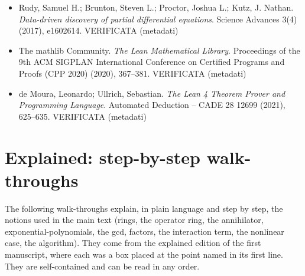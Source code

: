 \documentclass[11pt]{article}
\theoremstyle{plain}
\theoremstyle{definition}
\theoremstyle{remark}
\begin{document}
\begin{itemize}[itemsep=2pt,leftmargin=1.2em,font=\small]
\item Rudy, Samuel H.; Brunton, Steven L.; Proctor, Joshua L.; Kutz, J. Nathan. \emph{Data-driven discovery of partial differential equations}. Science Advances 3(4) (2017), e1602614. \textsf{\footnotesize VERIFICATA (metadati)}
\item {The mathlib Community}. \emph{The {L}ean Mathematical Library}. Proceedings of the 9th ACM SIGPLAN International Conference on Certified Programs and Proofs (CPP 2020) (2020), 367--381. \textsf{\footnotesize VERIFICATA (metadati)}
\item de Moura, Leonardo; Ullrich, Sebastian. \emph{The {L}ean 4 Theorem Prover and Programming Language}. Automated Deduction -- CADE 28 12699 (2021), 625--635. \textsf{\footnotesize VERIFICATA (metadati)}
\end{itemize}



\section{Explained: step-by-step walk-throughs}\label{app:explained}
\noindent The following walk-throughs explain, in plain language and step by step, the notions used in the main text (rings, the operator ring, the annihilator, exponential-polynomials, the gcd, factors, the interaction term, the nonlinear case, the algorithm). They come from the explained edition of the first manuscript, where each was a box placed at the point named in its first line. They are self-contained and can be read in any order.
\end{document}
